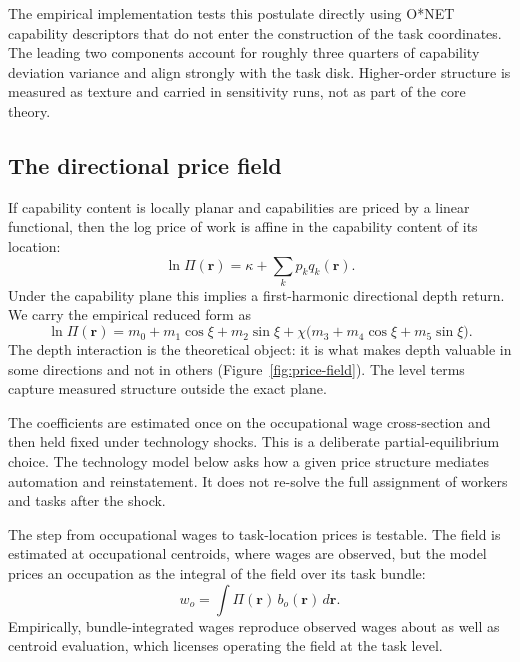 \documentclass[12pt, a4paper]{article}
\begin{document}
The empirical implementation tests this postulate directly using
O*NET capability descriptors that do not enter the construction of the
task coordinates. The leading two components account for roughly three
quarters of capability deviation variance and align strongly with the
task disk. Higher-order structure is measured as texture and carried in
sensitivity runs, not as part of the core theory.

\subsection{The directional price field}
\label{sec:directional-price}

If capability content is locally planar and capabilities are priced by
a linear functional, then the log price of work is affine in the
capability content of its location:
\[
  \ln \Pi(\mathbf{r})
  =
  \kappa
  +
  \sum_k p_k q_k(\mathbf{r}).
\]
Under the capability plane this implies a first-harmonic directional
depth return. We carry the empirical reduced form as
\begin{equation}
  \ln \Pi(\mathbf{r})
  =
  m_0 + m_1\cos\xi + m_2\sin\xi
  +
  \chi
  \bigl(
    m_3 + m_4\cos\xi + m_5\sin\xi
  \bigr).
  \label{eq:price-field}
\end{equation}
The depth interaction is the theoretical object: it is what makes
depth valuable in some directions and not in others (Figure~\ref{fig:price-field}). The level terms
capture measured structure outside the exact plane.

The coefficients are estimated once on the occupational wage
cross-section and then held fixed under technology shocks. This is a
deliberate partial-equilibrium choice. The technology model below asks
how a given price structure mediates automation and reinstatement. It
does not re-solve the full assignment of workers and tasks after the
shock.

The step from occupational wages to task-location prices is testable.
The field is estimated at occupational centroids, where wages are
observed, but the model prices an occupation as the integral of the
field over its task bundle:
\begin{equation}
  w_o
  =
  \int \Pi(\mathbf{r})\,b_o(\mathbf{r})\,d\mathbf{r}.
  \label{eq:wage-bundle}
\end{equation}
Empirically, bundle-integrated wages reproduce observed wages about as
well as centroid evaluation, which licenses operating the field at the
task level.
\end{document}

